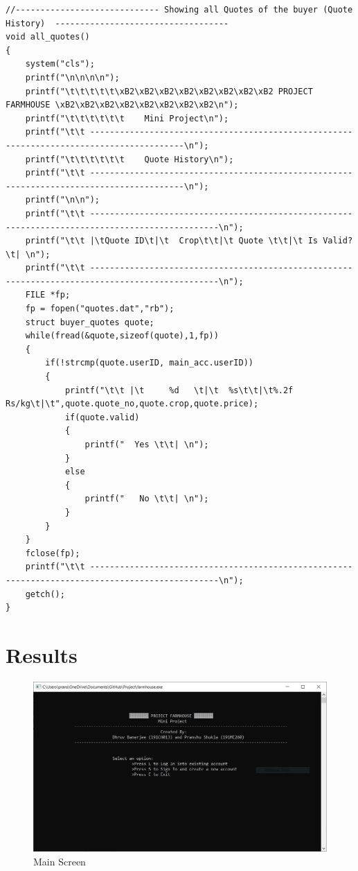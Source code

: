 \documentclass[12pt]{article}
\begin{document}
\begin{lstlisting}
//----------------------------- Showing all Quotes of the buyer (Quote History)  -----------------------------------
void all_quotes()
{
    system("cls");
    printf("\n\n\n\n");
    printf("\t\t\t\t\t\xB2\xB2\xB2\xB2\xB2\xB2\xB2\xB2 PROJECT FARMHOUSE \xB2\xB2\xB2\xB2\xB2\xB2\xB2\xB2\n");
    printf("\t\t\t\t\t\t    Mini Project\n");
    printf("\t\t -----------------------------------------------------------------------------------------\n");
    printf("\t\t\t\t\t\t    Quote History\n");
    printf("\t\t -----------------------------------------------------------------------------------------\n");
    printf("\n\n");
    printf("\t\t ------------------------------------------------------------------------------------------------\n");
    printf("\t\t |\tQuote ID\t|\t  Crop\t\t|\t Quote \t\t|\t Is Valid? \t| \n");
    printf("\t\t ------------------------------------------------------------------------------------------------\n");
    FILE *fp;
    fp = fopen("quotes.dat","rb");
    struct buyer_quotes quote;
    while(fread(&quote,sizeof(quote),1,fp))
    {
        if(!strcmp(quote.userID, main_acc.userID))
        {
            printf("\t\t |\t     %d   \t|\t  %s\t\t|\t%.2f Rs/kg\t|\t",quote.quote_no,quote.crop,quote.price);
            if(quote.valid)
            {
                printf("  Yes \t\t| \n");
            }
            else
            {
                printf("   No \t\t| \n");
            }
        }
    }
    fclose(fp);
    printf("\t\t ------------------------------------------------------------------------------------------------\n");
    getch();
}

\end{lstlisting}

\newpage            %
\section{Results}   %

\begin{figure}[h!]
    \centering
    \includegraphics[width = \columnwidth]{ScreenShots/Main_Page.JPG} 
    \caption{Main Screen}
\end{figure}
\end{document}
